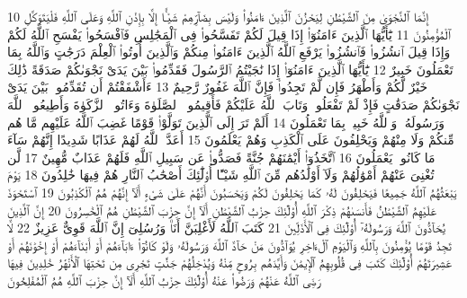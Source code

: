{\tiny\colorbox{cl_aya}{10}} إِنَّمَا ٱلنَّجْوَىٰ مِنَ ٱلشَّيْطَٰنِ لِيَحْزُنَ ٱلَّذِينَ ءَامَنُوا۟ وَلَيْسَ بِضَآرِّهِمْ شَيْـًٔا إِلَّا بِإِذْنِ ٱللَّهِ وَعَلَى ٱللَّهِ فَلْيَتَوَكَّلِ ٱلْمُؤْمِنُونَ
{\tiny\colorbox{cl_aya}{11}} يَٰٓأَيُّهَا ٱلَّذِينَ ءَامَنُوٓا۟ إِذَا قِيلَ لَكُمْ تَفَسَّحُوا۟ فِى ٱلْمَجَٰلِسِ فَٱفْسَحُوا۟ يَفْسَحِ ٱللَّهُ لَكُمْ وَإِذَا قِيلَ ٱنشُزُوا۟ فَٱنشُزُوا۟ يَرْفَعِ ٱللَّهُ ٱلَّذِينَ ءَامَنُوا۟ مِنكُمْ وَٱلَّذِينَ أُوتُوا۟ ٱلْعِلْمَ دَرَجَٰتٍ وَٱللَّهُ بِمَا تَعْمَلُونَ خَبِيرٌ
{\tiny\colorbox{cl_aya}{12}} يَٰٓأَيُّهَا ٱلَّذِينَ ءَامَنُوٓا۟ إِذَا نَٰجَيْتُمُ ٱلرَّسُولَ فَقَدِّمُوا۟ بَيْنَ يَدَىْ نَجْوَىٰكُمْ صَدَقَةً ذَٰلِكَ خَيْرٌ لَّكُمْ وَأَطْهَرُ فَإِن لَّمْ تَجِدُوا۟ فَإِنَّ ٱللَّهَ غَفُورٌ رَّحِيمٌ
{\tiny\colorbox{cl_aya}{13}} ءَأَشْفَقْتُمْ أَن تُقَدِّمُوا۟ بَيْنَ يَدَىْ نَجْوَىٰكُمْ صَدَقَٰتٍ فَإِذْ لَمْ تَفْعَلُوا۟ وَتَابَ ٱللَّهُ عَلَيْكُمْ فَأَقِيمُوا۟ ٱلصَّلَوٰةَ وَءَاتُوا۟ ٱلزَّكَوٰةَ وَأَطِيعُوا۟ ٱللَّهَ وَرَسُولَهُۥ وَٱللَّهُ خَبِيرٌۢ بِمَا تَعْمَلُونَ
{\tiny\colorbox{cl_aya}{14}} أَلَمْ تَرَ إِلَى ٱلَّذِينَ تَوَلَّوْا۟ قَوْمًا غَضِبَ ٱللَّهُ عَلَيْهِم مَّا هُم مِّنكُمْ وَلَا مِنْهُمْ وَيَحْلِفُونَ عَلَى ٱلْكَذِبِ وَهُمْ يَعْلَمُونَ
{\tiny\colorbox{cl_aya}{15}} أَعَدَّ ٱللَّهُ لَهُمْ عَذَابًا شَدِيدًا إِنَّهُمْ سَآءَ مَا كَانُوا۟ يَعْمَلُونَ
{\tiny\colorbox{cl_aya}{16}} ٱتَّخَذُوٓا۟ أَيْمَٰنَهُمْ جُنَّةً فَصَدُّوا۟ عَن سَبِيلِ ٱللَّهِ فَلَهُمْ عَذَابٌ مُّهِينٌ
{\tiny\colorbox{cl_aya}{17}} لَّن تُغْنِىَ عَنْهُمْ أَمْوَٰلُهُمْ وَلَآ أَوْلَٰدُهُم مِّنَ ٱللَّهِ شَيْـًٔا أُو۟لَٰٓئِكَ أَصْحَٰبُ ٱلنَّارِ هُمْ فِيهَا خَٰلِدُونَ
{\tiny\colorbox{cl_aya}{18}} يَوْمَ يَبْعَثُهُمُ ٱللَّهُ جَمِيعًا فَيَحْلِفُونَ لَهُۥ كَمَا يَحْلِفُونَ لَكُمْ وَيَحْسَبُونَ أَنَّهُمْ عَلَىٰ شَىْءٍ أَلَآ إِنَّهُمْ هُمُ ٱلْكَٰذِبُونَ
{\tiny\colorbox{cl_aya}{19}} ٱسْتَحْوَذَ عَلَيْهِمُ ٱلشَّيْطَٰنُ فَأَنسَىٰهُمْ ذِكْرَ ٱللَّهِ أُو۟لَٰٓئِكَ حِزْبُ ٱلشَّيْطَٰنِ أَلَآ إِنَّ حِزْبَ ٱلشَّيْطَٰنِ هُمُ ٱلْخَٰسِرُونَ
{\tiny\colorbox{cl_aya}{20}} إِنَّ ٱلَّذِينَ يُحَآدُّونَ ٱللَّهَ وَرَسُولَهُۥٓ أُو۟لَٰٓئِكَ فِى ٱلْأَذَلِّينَ
{\tiny\colorbox{cl_aya}{21}} كَتَبَ ٱللَّهُ لَأَغْلِبَنَّ أَنَا۠ وَرُسُلِىٓ إِنَّ ٱللَّهَ قَوِىٌّ عَزِيزٌ
{\tiny\colorbox{cl_aya}{22}} لَّا تَجِدُ قَوْمًا يُؤْمِنُونَ بِٱللَّهِ وَٱلْيَوْمِ ٱلْءَاخِرِ يُوَآدُّونَ مَنْ حَآدَّ ٱللَّهَ وَرَسُولَهُۥ وَلَوْ كَانُوٓا۟ ءَابَآءَهُمْ أَوْ أَبْنَآءَهُمْ أَوْ إِخْوَٰنَهُمْ أَوْ عَشِيرَتَهُمْ أُو۟لَٰٓئِكَ كَتَبَ فِى قُلُوبِهِمُ ٱلْإِيمَٰنَ وَأَيَّدَهُم بِرُوحٍ مِّنْهُ وَيُدْخِلُهُمْ جَنَّٰتٍ تَجْرِى مِن تَحْتِهَا ٱلْأَنْهَٰرُ خَٰلِدِينَ فِيهَا رَضِىَ ٱللَّهُ عَنْهُمْ وَرَضُوا۟ عَنْهُ أُو۟لَٰٓئِكَ حِزْبُ ٱللَّهِ أَلَآ إِنَّ حِزْبَ ٱللَّهِ هُمُ ٱلْمُفْلِحُونَ
